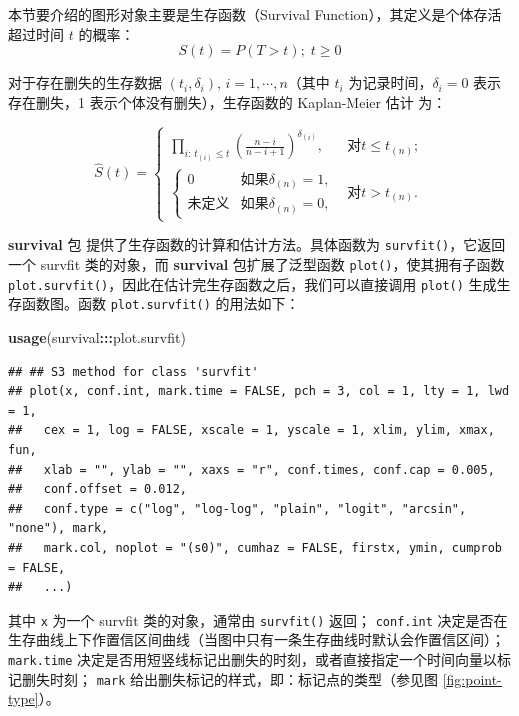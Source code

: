 \documentclass[
  b5paper,
  UTF8,twoside]{book}
\newenvironment{Shaded}{\begin{snugshade}}{\end{snugshade}}
\newcommand{\FunctionTok}[1]{\textcolor[rgb]{0.13,0.29,0.53}{\textbf{#1}}}
\newcommand{\NormalTok}[1]{#1}
\newcommand{\SpecialCharTok}[1]{\textcolor[rgb]{0.81,0.36,0.00}{\textbf{#1}}}
\newcounter{none} %
\begin{document}
本节要介绍的图形对象主要是生存函数（Survival Function），其定义是个体存活超过时间 \(t\) 的概率： \[S(t)=P(T>t);\; t\geq0\]

对于存在删失的生存数据 \((t_{i},\delta_{i}),\, i=1,\cdots,n\)（其中 \(t_{i}\) 为记录时间，\(\delta_{i}=0\) 表示存在删失，1 表示个体没有删失），生存函数的 Kaplan-Meier 估计 \citep{Kaplan58} 为：

\[\hat{S}(t)=\left\{ \begin{array}{ll}
\prod_{i:\, t_{(i)}\leq t}(\frac{n-i}{n-i+1})^{\delta_{(i)}}, & \mbox{对}t\leq t_{(n)};\\
\left\{ \begin{array}{ll}
0 & \mbox{如果}\delta_{(n)}=1,\\
\mbox{未定义} & \mbox{如果}\delta_{(n)}=0,
\end{array}\right. & \mbox{对}t>t_{(n)}.
\end{array}\right.\]

\textbf{survival} 包 \citep{survival} 提供了生存函数的计算和估计方法。具体函数为 \texttt{survfit()}，它返回一个 survfit 类的对象，而 \textbf{survival} 包扩展了泛型函数 \texttt{plot()}，使其拥有子函数 \texttt{plot.survfit()}，因此在估计完生存函数之后，我们可以直接调用 \texttt{plot()} 生成生存函数图。函数 \texttt{plot.survfit()} 的用法如下：

\begin{Shaded}
\begin{Highlighting}[]
\FunctionTok{usage}\NormalTok{(survival}\SpecialCharTok{:::}\NormalTok{plot.survfit)}
\end{Highlighting}
\end{Shaded}

\begin{verbatim}
## ## S3 method for class 'survfit'
## plot(x, conf.int, mark.time = FALSE, pch = 3, col = 1, lty = 1, lwd = 1,
##   cex = 1, log = FALSE, xscale = 1, yscale = 1, xlim, ylim, xmax, fun,
##   xlab = "", ylab = "", xaxs = "r", conf.times, conf.cap = 0.005,
##   conf.offset = 0.012,
##   conf.type = c("log", "log-log", "plain", "logit", "arcsin", "none"), mark,
##   mark.col, noplot = "(s0)", cumhaz = FALSE, firstx, ymin, cumprob = FALSE,
##   ...)
\end{verbatim}

其中 \texttt{x} 为一个 survfit 类的对象，通常由 \texttt{survfit()} 返回； \texttt{conf.int} 决定是否在生存曲线上下作置信区间曲线（当图中只有一条生存曲线时默认会作置信区间）； \texttt{mark.time} 决定是否用短竖线标记出删失的时刻，或者直接指定一个时间向量以标记删失时刻； \texttt{mark} 给出删失标记的样式，即：标记点的类型（参见图 \ref{fig:point-type}）。
\end{document}
